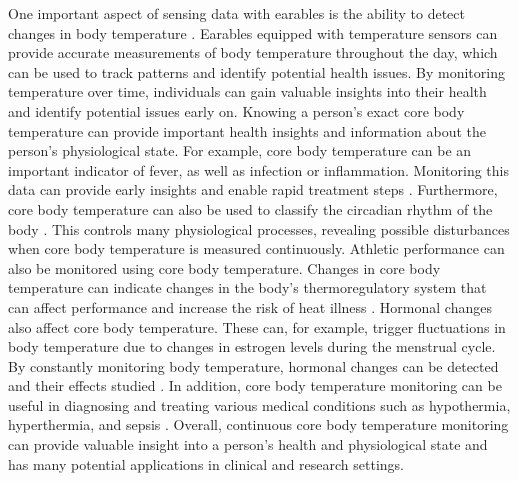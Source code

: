One important aspect of sensing data with earables is the ability to detect changes in body temperature \cite{dolsonWearableSensorTechnology2022, bonziAccuracyPeripheralThermometers2016, NovelWearableDevice2021}. 
Earables equipped with temperature sensors can provide accurate measurements of body temperature throughout the day, which can be used to track patterns and identify potential health issues. 
By monitoring temperature over time, individuals can gain valuable insights into their health and identify potential issues early on.
Knowing a person's exact core body temperature can provide important health insights and information about the person's physiological state.
For example, core body temperature can be an important indicator of fever, as well as infection or inflammation. 
Monitoring this data can provide early insights and enable rapid treatment steps \cite{NovelWearableDevice2021}.
Furthermore, core body temperature can also be used to classify the circadian rhythm of the body \cite{liCircadianRhythmAnalysis2021, juSleepQualityPreclinical2013}.
This controls many physiological processes, revealing possible disturbances when core body temperature is measured continuously.
Athletic performance can also be monitored using core body temperature. Changes in core body temperature can indicate changes in the body's thermoregulatory system that can affect performance and increase the risk of heat illness \cite{gabbettAthleteMonitoringCycle2017, silvaSleepQualityTraining2022}.
Hormonal changes also affect core body temperature. 
These can, for example, trigger fluctuations in body temperature due to changes in estrogen levels during the menstrual cycle. 
By constantly monitoring body temperature, hormonal changes can be detected and their effects studied \cite{goeckenjanContinuousBodyTemperature2020, charkoudianAutonomicControlBody2017, hamataniEstimatingCoreBody2015}.
In addition, core body temperature monitoring can be useful in diagnosing and treating various medical conditions such as hypothermia, hyperthermia, and sepsis \cite{hardingTemperatureDependenceSleep2019, Doi101016, raymannSkinDeepEnhanced2008}.
Overall, continuous core body temperature monitoring can provide valuable insight into a person's health and physiological state and has many potential applications in clinical and research settings.

